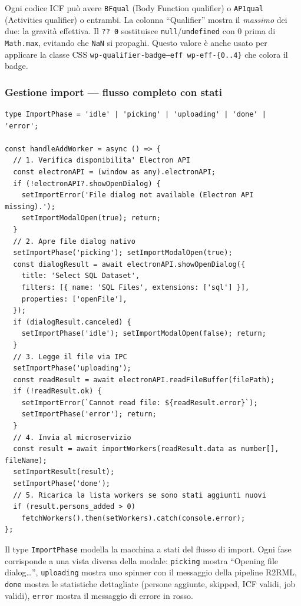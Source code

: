 \documentclass[a4paper,12pt]{article}
\begin{document}
\noindent Ogni codice ICF pu\`{o} avere \texttt{BFqual} (Body Function qualifier)
o \texttt{AP1qual} (Activities qualifier) o entrambi. La colonna
``Qualifier'' mostra il \textit{massimo} dei due: la gravit\`{a}
effettiva. Il \texttt{?? 0} sostituisce \texttt{null}/\texttt{undefined}
con 0 prima di \texttt{Math.max}, evitando che \texttt{NaN} si propaghi.
Questo valore \`{e} anche usato per applicare la classe CSS
\texttt{wp-qualifier-badge--eff wp-eff-\{0..4\}} che colora il badge.

\subsubsection{Gestione import --- flusso completo con stati}
\vspace{2pt}
\begin{lstlisting}
type ImportPhase = 'idle' | 'picking' | 'uploading' | 'done' | 'error';

const handleAddWorker = async () => {
  // 1. Verifica disponibilita' Electron API
  const electronAPI = (window as any).electronAPI;
  if (!electronAPI?.showOpenDialog) {
    setImportError('File dialog not available (Electron API missing).');
    setImportModalOpen(true); return;
  }
  // 2. Apre file dialog nativo
  setImportPhase('picking'); setImportModalOpen(true);
  const dialogResult = await electronAPI.showOpenDialog({
    title: 'Select SQL Dataset',
    filters: [{ name: 'SQL Files', extensions: ['sql'] }],
    properties: ['openFile'],
  });
  if (dialogResult.canceled) {
    setImportPhase('idle'); setImportModalOpen(false); return;
  }
  // 3. Legge il file via IPC
  setImportPhase('uploading');
  const readResult = await electronAPI.readFileBuffer(filePath);
  if (!readResult.ok) {
    setImportError(`Cannot read file: ${readResult.error}`);
    setImportPhase('error'); return;
  }
  // 4. Invia al microservizio
  const result = await importWorkers(readResult.data as number[], fileName);
  setImportResult(result);
  setImportPhase('done');
  // 5. Ricarica la lista workers se sono stati aggiunti nuovi
  if (result.persons_added > 0)
    fetchWorkers().then(setWorkers).catch(console.error);
};
\end{lstlisting}

\noindent Il type \texttt{ImportPhase} modella la macchina a stati del flusso
di import. Ogni fase corrisponde a una vista diversa della modale:
\texttt{picking} mostra ``Opening file dialog\ldots'',
\texttt{uploading} mostra uno spinner con il messaggio della pipeline
R2RML, \texttt{done} mostra le statistiche dettagliate (persone aggiunte,
skipped, ICF validi, job validi), \texttt{error} mostra il messaggio
di errore in rosso.
\end{document}
